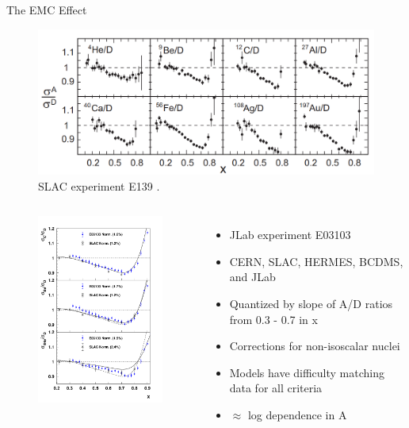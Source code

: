 \documentclass[12pt,usenames,dvipsnames]{beamer}
\begin{document}
\begin{frame}{The EMC Effect}

\begin{figure}
\caption*{\label{EMC_slac} SLAC experiment E139 \cite{slac_emc} .}
\includegraphics[width =12cm]{../images/EMC_slac_horiz.png}
\end{figure}


\end{frame}

\begin{frame}
\begin{columns}
\vspace{-30pt}
\begin{figure}
	\includegraphics[width=6cm]{../images/carbon_be_he4}
\end{figure}

	\begin{itemize}
		\item<1-> JLab experiment E03103 \cite{E3103} 
		\item<2-> CERN, SLAC, HERMES, BCDMS, and JLab
		\item<3-> Quantized by slope of A/D ratios from 0.3 - 0.7 in x
		\item<4-> Corrections for non-isoscalar nuclei
		\item<5-> Models have difficulty matching data for all criteria
		\item<6-> $\approx$ log dependence in A
	\end{itemize}

\end{columns}
\end{frame}
\end{document}
